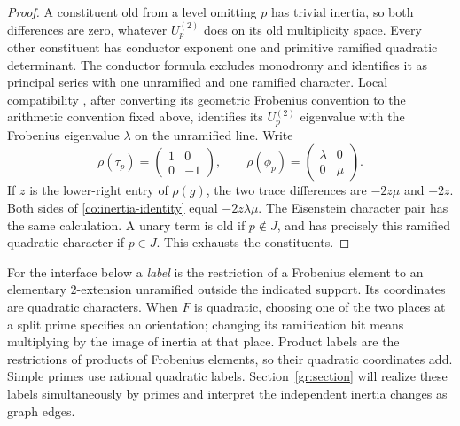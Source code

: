 \begin{proof}
A constituent old from a level omitting $p$ has trivial inertia, so
both differences are zero, whatever $U_p^{(2)}$ does on its old
multiplicity space.  Every other constituent has conductor exponent
one and primitive ramified quadratic determinant.  The conductor
formula excludes monodromy and identifies it as principal series
with one unramified and one ramified character.  Local compatibility
\cite[Theorem~(A)]{Carayol1986}, after converting its geometric
Frobenius convention to the arithmetic convention fixed above,
identifies its $U_p^{(2)}$ eigenvalue
with the Frobenius eigenvalue $\lambda$ on the unramified line.
Write
\[
 \rho(\tau_p)=\begin{pmatrix}1&0\\0&-1\end{pmatrix},\qquad
 \rho(\phi_p)=\begin{pmatrix}\lambda&0\\0&\mu\end{pmatrix}.
\]
If $z$ is the lower-right entry of $\rho(g)$, the two trace
differences are $-2z\mu$ and $-2z$.  Both sides of
\eqref{co:inertia-identity} equal $-2z\lambda\mu$.
The Eisenstein character pair has the same calculation.
A unary term is old if $p\notin J$, and has precisely this ramified
quadratic character if $p\in J$.  This exhausts the constituents.
\end{proof}

For the interface below a \emph{label} is the restriction of a
Frobenius element to an elementary $2$-extension unramified outside
the indicated support.  Its coordinates are quadratic characters.
When $F$ is quadratic, choosing one of the two places at a split prime specifies an
orientation; changing its ramification bit means multiplying by the
image of inertia at that place.  Product labels are the restrictions
of products of Frobenius elements, so their quadratic coordinates add.
Simple primes use rational quadratic labels.  Section~\ref{gr:section}
will realize these labels simultaneously by primes and interpret the
independent inertia changes as graph edges.

